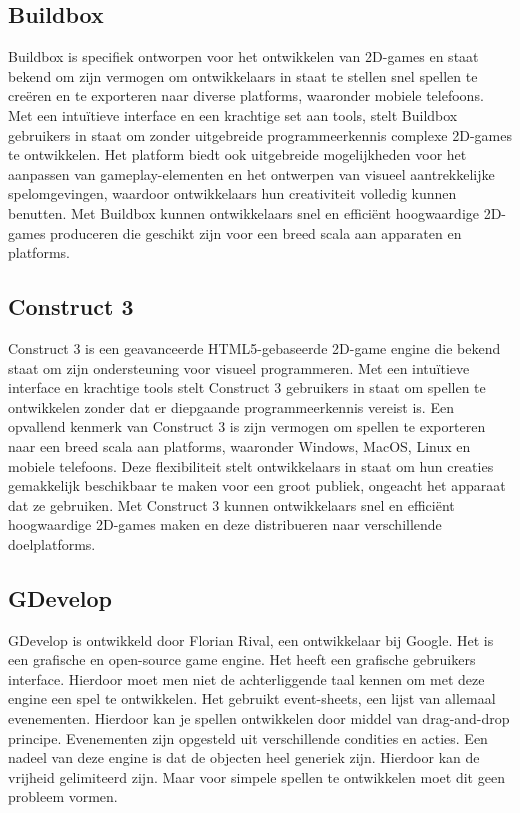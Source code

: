 \subsection{Buildbox}
Buildbox is specifiek ontworpen voor het ontwikkelen van 2D-games en staat bekend om zijn vermogen om ontwikkelaars in staat te stellen snel spellen te creëren en te exporteren naar diverse platforms, waaronder mobiele telefoons. Met een intuïtieve interface en een krachtige set aan tools, stelt Buildbox gebruikers in staat om zonder uitgebreide programmeerkennis complexe 2D-games te ontwikkelen. Het platform biedt ook uitgebreide mogelijkheden voor het aanpassen van gameplay-elementen en het ontwerpen van visueel aantrekkelijke spelomgevingen, waardoor ontwikkelaars hun creativiteit volledig kunnen benutten. Met Buildbox kunnen ontwikkelaars snel en efficiënt hoogwaardige 2D-games produceren die geschikt zijn voor een breed scala aan apparaten en platforms. \autocite{audronis2016buildbox}

\subsection{Construct 3}
Construct 3 is een geavanceerde HTML5-gebaseerde 2D-game engine die bekend staat om zijn ondersteuning voor visueel programmeren. Met een intuïtieve interface en krachtige tools stelt Construct 3 gebruikers in staat om spellen te ontwikkelen zonder dat er diepgaande programmeerkennis vereist is. Een opvallend kenmerk van Construct 3 is zijn vermogen om spellen te exporteren naar een breed scala aan platforms, waaronder Windows, MacOS, Linux en mobiele telefoons. Deze flexibiliteit stelt ontwikkelaars in staat om hun creaties gemakkelijk beschikbaar te maken voor een groot publiek, ongeacht het apparaat dat ze gebruiken. Met Construct 3 kunnen ontwikkelaars snel en efficiënt hoogwaardige 2D-games maken en deze distribueren naar verschillende doelplatforms. \autocite{enwiki:1200994136}

\subsection{GDevelop}
GDevelop is ontwikkeld door Florian Rival, een ontwikkelaar bij Google. Het is een grafische en open-source game engine. Het heeft een grafische gebruikers interface. Hierdoor moet men niet de achterliggende taal kennen om met deze engine een spel te ontwikkelen. Het gebruikt event-sheets, een lijst van allemaal evenementen. Hierdoor kan je spellen ontwikkelen door middel van drag-and-drop principe. Evenementen zijn opgesteld uit verschillende condities en acties. Een nadeel van deze engine is dat de objecten heel generiek zijn. Hierdoor kan de vrijheid gelimiteerd zijn. Maar voor simpele spellen te ontwikkelen moet dit geen probleem vormen.\autocite{mohd2023analyzing}